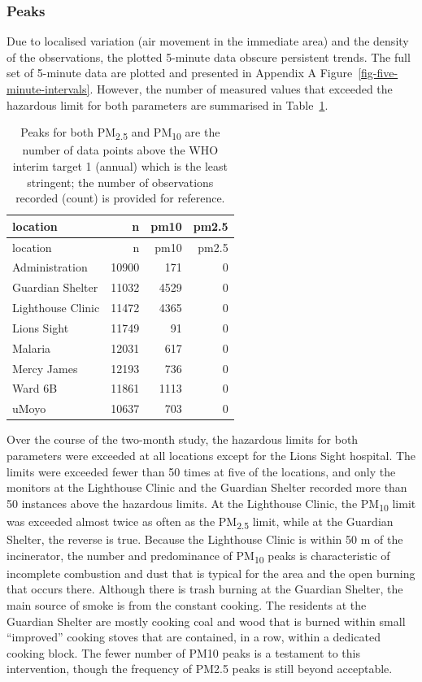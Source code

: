 \documentclass[
  authoryear,
  review,
  3p]{elsarticle}
\begin{document}
\hypertarget{peaks}{%
\subsubsection{Peaks}\label{peaks}}

Due to localised variation (air movement in the immediate area) and the
density of the observations, the plotted 5-minute data obscure
persistent trends. The full set of 5-minute data are plotted and
presented in Appendix A Figure~\ref{fig-five-minute-intervals}. However,
the number of measured values that exceeded the hazardous limit for both
parameters are summarised in Table~\ref{tbl-peaks}.

\hypertarget{tbl-peaks}{}
\begin{longtable}[]{@{}lrrr@{}}
\caption{\label{tbl-peaks}Peaks for both PM\textsubscript{2.5} and
PM\textsubscript{10} are the number of data points above the WHO interim
target 1 (annual) which is the least stringent; the number of
observations recorded (count) is provided for reference.}\tabularnewline
\toprule\noalign{}
location & n & pm10 & pm2.5 \\
\midrule\noalign{}
\endfirsthead
\toprule\noalign{}
location & n & pm10 & pm2.5 \\
\midrule\noalign{}
\endhead
\bottomrule\noalign{}
\endlastfoot
Administration & 10900 & 171 & 0 \\
Guardian Shelter & 11032 & 4529 & 0 \\
Lighthouse Clinic & 11472 & 4365 & 0 \\
Lions Sight & 11749 & 91 & 0 \\
Malaria & 12031 & 617 & 0 \\
Mercy James & 12193 & 736 & 0 \\
Ward 6B & 11861 & 1113 & 0 \\
uMoyo & 10637 & 703 & 0 \\
\end{longtable}

Over the course of the two-month study, the hazardous limits for both
parameters were exceeded at all locations except for the Lions Sight
hospital. The limits were exceeded fewer than 50 times at five of the
locations, and only the monitors at the Lighthouse Clinic and the
Guardian Shelter recorded more than 50 instances above the hazardous
limits. At the Lighthouse Clinic, the PM\textsubscript{10} limit was
exceeded almost twice as often as the PM\textsubscript{2.5} limit, while
at the Guardian Shelter, the reverse is true. Because the Lighthouse
Clinic is within 50 m of the incinerator, the number and predominance of
PM\textsubscript{10} peaks is characteristic of incomplete combustion
and dust that is typical for the area and the open burning that occurs
there. Although there is trash burning at the Guardian Shelter, the main
source of smoke is from the constant cooking. The residents at the
Guardian Shelter are mostly cooking coal and wood that is burned within
small ``improved'' cooking stoves that are contained, in a row, within a
dedicated cooking block. The fewer number of PM10 peaks is a testament
to this intervention, though the frequency of PM2.5 peaks is still
beyond acceptable.
\end{document}
